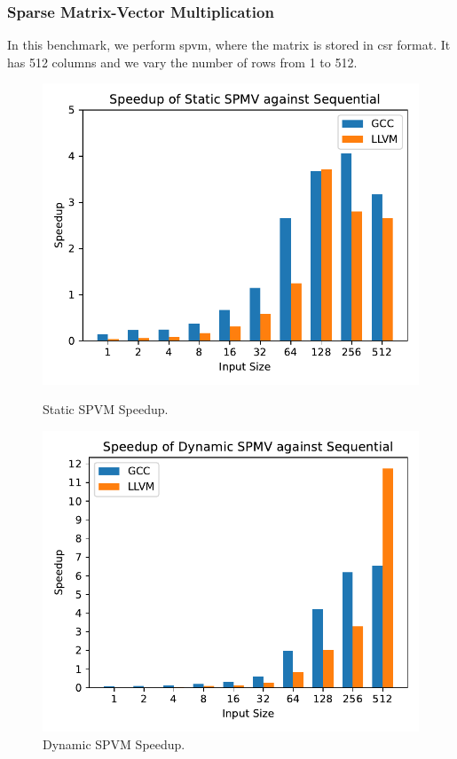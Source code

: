 \subsubsection{Sparse Matrix-Vector Multiplication}

In this benchmark, we perform \gls{spvm}, where the matrix is stored in
\gls{csr} format. It has 512 columns and we vary the number of rows from 1 to 512.

\begin{figure}[h]
	\centering
	\begin{minipage}{0.49\textwidth}
		\centering
		\includegraphics[width=\linewidth]{./fig/benchmarks/spvm_speedup_static.pdf}
		\caption{Static SPVM Speedup.}%
		\label{fig:spvm-static-speedup}
	\end{minipage}\hfill
	\begin{minipage}{0.49\textwidth}
		\centering
		\includegraphics[width=\linewidth]{./fig/benchmarks/spvm_speedup_dynamic.pdf}
		\caption{Dynamic SPVM Speedup.}%
		\label{fig:spvm-dynamic-speedup}
	\end{minipage}
\end{figure}

